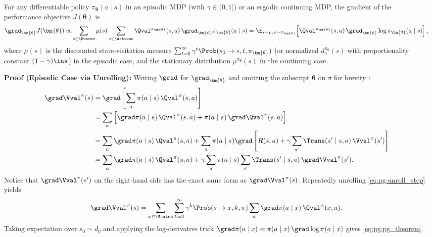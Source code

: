 \documentclass[../../../../master.tex]{subfiles}
\begin{document}
\begin{coremath}
For any differentiable policy $\pi_{\bm{\theta}}(a \mid s)$ in an episodic MDP (with $\gamma \in (0, 1]$) or an ergodic continuing MDP, the gradient of the performance objective $J(\bm{\theta})$ is
\begin{equation}\label{eq:pg:pg_theorem}
  \grad_{\bm{\theta}} J(\bm{\theta}) \propto \sum_{s \in \States} \mu(s) \sum_{a \in \Actions} \Qval^{\pi_{\bm{\theta}}}(s, a)\, \grad_{\bm{\theta}} \pi_{\bm{\theta}}(a \mid s)
  = \E_{s \sim \mu,\, a \sim \pi_{\bm{\theta}}}\!\left[ \Qval^{\pi_{\bm{\theta}}}(s, a)\, \grad_{\bm{\theta}} \log \pi_{\bm{\theta}}(a \mid s) \right],
\end{equation}
where $\mu(s)$ is the discounted state-visitation measure $\sum_{t=0}^\infty \gamma^t \Prob(s_0 \to s, t, \pi_{\bm{\theta}})$ (or normalized $d^{\pi_{\bm{\theta}}}_\gamma(s)$ with proportionality constant $(1-\gamma)\inv$) in the episodic case, and the stationary distribution $\mu^{\pi_{\bm{\theta}}}(s)$ in the continuing case.

\medskip
\noindent\textbf{Proof (Episodic Case via Unrolling):} Writing $\grad$ for $\grad_{\bm{\theta}}$ and omitting the subscript $\bm{\theta}$ on $\pi$ for brevity  :
\begin{align}
  \grad \Vval^\pi(s) &= \grad \left[ \sum_{a} \pi(a \mid s)\, \Qval^\pi(s, a) \right] \nonumber \\
  &= \sum_{a} \Big[ \grad\pi(a \mid s)\, \Qval^\pi(s, a) + \pi(a \mid s)\, \grad \Qval^\pi(s, a) \Big] \nonumber \\
  &= \sum_{a} \grad\pi(a \mid s)\, \Qval^\pi(s, a) + \sum_{a} \pi(a \mid s) \grad \left[ R(s,a) + \gamma \sum_{s'} \Trans(s' \mid s, a)\, \Vval^\pi(s') \right] \nonumber \\
  &= \sum_{a} \grad\pi(a \mid s)\, \Qval^\pi(s, a) + \gamma \sum_{a} \pi(a \mid s) \sum_{s'} \Trans(s' \mid s, a)\, \grad \Vval^\pi(s'). \label{eq:pg:unroll_step}
\end{align}
Notice that $\grad \Vval^\pi(s')$ on the right-hand side has the exact same form as $\grad \Vval^\pi(s)$. Repeatedly unrolling \eqref{eq:pg:unroll_step} yields
\begin{equation}\label{eq:pg:unrolled}
  \grad \Vval^\pi(s) = \sum_{x \in \States} \sum_{k=0}^\infty \gamma^k \Prob(s \to x, k, \pi) \sum_{a} \grad \pi(a \mid x)\, \Qval^\pi(x, a).
\end{equation}
Taking expectation over $s_0 \sim d_0$ and applying the log-derivative trick $\grad \pi(a \mid x) = \pi(a \mid x)\, \grad \log \pi(a \mid x)$ gives \eqref{eq:pg:pg_theorem}.


\end{coremath}
\end{document}
